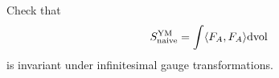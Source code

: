 \begin{exercise}
  Check that
  \begin{equation*}
    S_{\text{naive}}^{\text{YM}}
    = \int \langle F_A, F_A \rangle \mathrm{d} \text{vol}
  \end{equation*}
  is invariant under infinitesimal gauge transformations.
\end{exercise}
